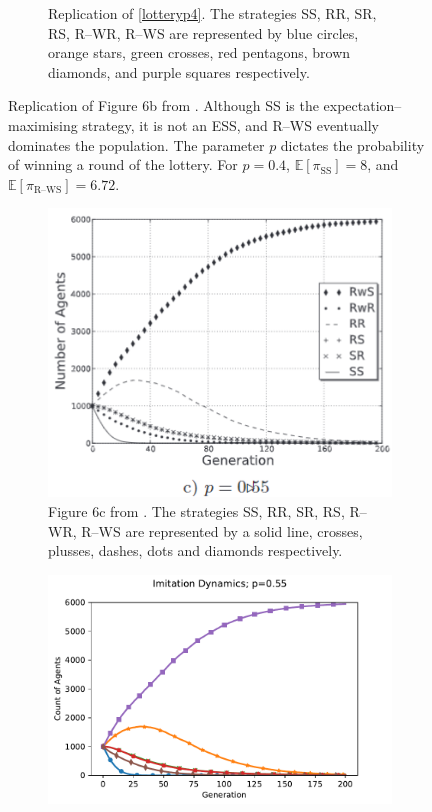 \begin{figure}[!h]
\begin{subfigure}[b]{0.45\textwidth}
    \caption{Replication of \ref{lotteryp4}. The strategies SS, RR, SR, RS, R--WR, R--WS are represented by blue circles, orange stars, green crosses, red pentagons, brown diamonds, and purple squares respectively. }
    \label{lotteryp4_me}
  \end{subfigure}
  \caption{Replication of Figure 6b from \cite{RN30}. Although SS is the expectation--maximising strategy, it is not an ESS, and R--WS eventually dominates the population. The parameter $p$ dictates the probability of winning a round of the lottery. For $p=0.4$, $\mathbb E [\pi_{\text{SS}}] = 8$, and $\mathbb E [\pi_{\text{R--WS}}] =6.72 $.} \label{lottery_comp4}
\end{figure} 
\FloatBarrier

 \FloatBarrier 
\begin{figure}[!h]
  \begin{subfigure}[b]{0.45\textwidth}
    \includegraphics[width=\textwidth]{images/lotteryp055.png}
    \caption{Figure 6c from \cite{RN30}. The strategies SS, RR, SR, RS, R--WR, R--WS are represented by a solid line, crosses, plusses, dashes, dots and diamonds respectively.}
    \label{lotteryp055}
  \end{subfigure}
  \hfill
  \begin{subfigure}[b]{0.45\textwidth}
    \includegraphics[width=1.25\textwidth]{images/lotteryp055_me.pdf}

\end{subfigure}
\end{figure}
